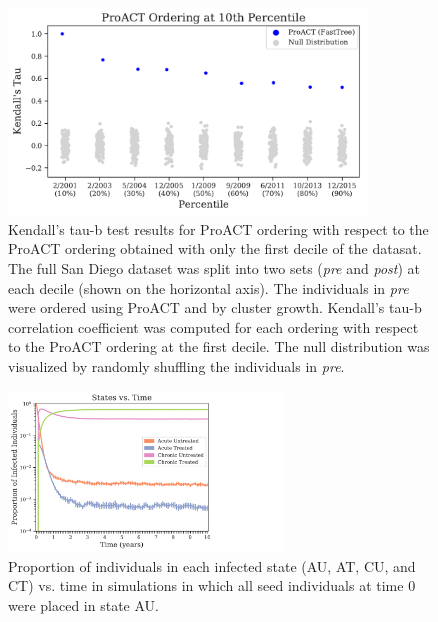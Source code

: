 \begin{figure} %
\centering
\includegraphics[width=0.85\textwidth]{figs/proact-tautest-first-proact}
\caption[Kendall's Tau-b Test vs. First ProACT Ordering]
{Kendall's tau-b test results for ProACT ordering with respect to the ProACT ordering obtained with only the first decile of the datasat. The full San Diego dataset was split into two sets (\textit{pre} and \textit{post}) at each decile (shown on the horizontal axis). The individuals in \textit{pre} were ordered using ProACT and by cluster growth. Kendall's tau-b correlation coefficient was computed for each ordering with respect to the ProACT ordering at the first decile. The null distribution was visualized by randomly shuffling the individuals in \textit{pre}.}
\label{fig:proact-tautest-first-proact}
\end{figure}

\begin{figure} %
\centering
\includegraphics[width=0.65\textwidth]{figs/proact-prop-state-vs-time}
\caption[Proportion of Individuals in Infected States vs. Time]
{Proportion of individuals in each infected state (AU, AT, CU, and CT) vs. time in simulations in which all seed individuals at time 0 were placed in state AU.}
\label{fig:proact-prop-state-vs-time}
\end{figure}

